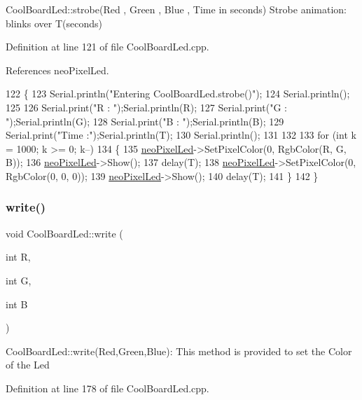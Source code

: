 Cool\+Board\+Led\+::strobe(\+Red , Green , Blue , Time in seconds) Strobe animation\+: blinks over T(seconds) 

Definition at line 121 of file Cool\+Board\+Led.\+cpp.



References neo\+Pixel\+Led.


\begin{DoxyCode}
122 \{
123     Serial.println(\textcolor{stringliteral}{"Entering CoolBoardLed.strobe()"});
124     Serial.println();
125 
126     Serial.print(\textcolor{stringliteral}{"R : "});Serial.println(R);
127     Serial.print(\textcolor{stringliteral}{"G : "});Serial.println(G);
128     Serial.print(\textcolor{stringliteral}{"B : "});Serial.println(B);
129     Serial.print(\textcolor{stringliteral}{"Time :"});Serial.println(T);
130     Serial.println();   
131 
132     
133     \textcolor{keywordflow}{for} (\textcolor{keywordtype}{int} k = 1000; k >= 0; k--) 
134     \{
135         \hyperlink{classCoolBoardLed_ac2c13fa462a010cd9242bf297c013923}{neoPixelLed}->SetPixelColor(0, RgbColor(R, G, B));
136         \hyperlink{classCoolBoardLed_ac2c13fa462a010cd9242bf297c013923}{neoPixelLed}->Show();
137         delay(T);
138         \hyperlink{classCoolBoardLed_ac2c13fa462a010cd9242bf297c013923}{neoPixelLed}->SetPixelColor(0, RgbColor(0, 0, 0));
139         \hyperlink{classCoolBoardLed_ac2c13fa462a010cd9242bf297c013923}{neoPixelLed}->Show();
140         delay(T);
141     \}
142 \}
\end{DoxyCode}
\mbox{\label{classCoolBoardLed_a30fadd4cbec17ceea428bf7a32207e87}} 
\subsubsection{\texorpdfstring{write()}{write()}}
{\footnotesize\ttfamily void Cool\+Board\+Led\+::write (\begin{DoxyParamCaption}\item[{int}]{R,  }\item[{int}]{G,  }\item[{int}]{B }\end{DoxyParamCaption})}

Cool\+Board\+Led\+::write(\+Red,\+Green,\+Blue)\+: This method is provided to set the Color of the Led 

Definition at line 178 of file Cool\+Board\+Led.\+cpp.



